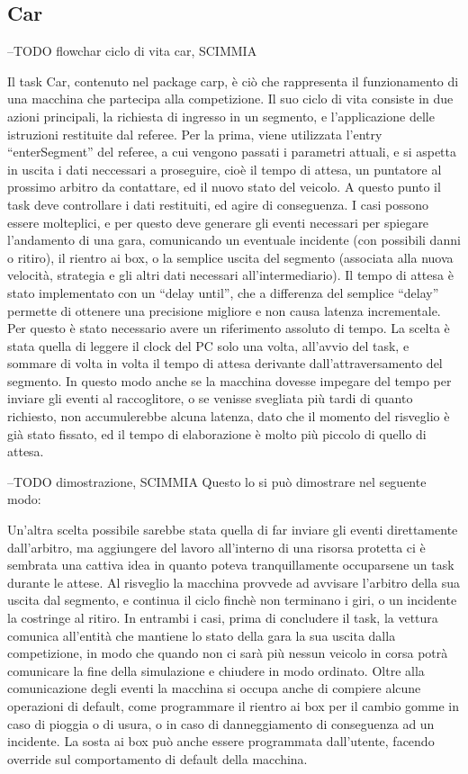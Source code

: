 \subsection{Car}

--TODO flowchar ciclo di vita car, SCIMMIA

Il task Car, contenuto nel package car\textunderscore p, è ciò che rappresenta il funzionamento di una macchina che partecipa alla competizione.
Il suo ciclo di vita consiste in due azioni principali, la richiesta di ingresso in un segmento, e l’applicazione delle istruzioni restituite dal referee.
Per la prima, viene utilizzata l’entry “enterSegment” del referee, a cui vengono passati i parametri attuali, e si aspetta in uscita i dati neccessari a proseguire, cioè il tempo di attesa, un puntatore al prossimo arbitro da contattare, ed il nuovo stato del veicolo.
A questo punto il task deve controllare i dati restituiti, ed agire di conseguenza. I casi possono essere molteplici, e per questo deve generare gli eventi necessari per spiegare l’andamento di una gara, comunicando un eventuale incidente (con possibili danni o ritiro), il rientro ai box, o la semplice uscita del segmento (associata alla nuova velocità, strategia e gli altri dati necessari all’intermediario).
Il tempo di attesa è stato implementato con un “delay until”, che a differenza del semplice “delay” permette di ottenere una precisione migliore e non causa latenza incrementale. Per questo è stato necessario avere un riferimento assoluto di tempo. La scelta è stata quella di leggere il clock del PC solo una volta, all’avvio del task, e sommare di volta in volta il tempo di attesa derivante dall’attraversamento del segmento.
In questo modo anche se la macchina dovesse impegare del tempo per inviare gli eventi al raccoglitore, o se venisse svegliata più tardi di quanto richiesto, non accumulerebbe alcuna latenza, dato che il momento del risveglio è già stato fissato, ed il tempo di elaborazione è molto più piccolo di quello di attesa.

--TODO dimostrazione, SCIMMIA
Questo lo si può dimostrare nel seguente modo:

Un’altra scelta possibile sarebbe stata quella di far inviare gli eventi direttamente dall’arbitro, ma aggiungere del lavoro all’interno di una risorsa protetta ci è sembrata una cattiva idea in quanto poteva tranquillamente occuparsene un task durante le attese.
Al risveglio la macchina provvede ad avvisare l’arbitro della sua uscita dal segmento, e continua il ciclo finchè non terminano i giri, o un incidente la costringe al ritiro. In entrambi i casi, prima di concludere il task, la vettura comunica all’entità che mantiene lo stato della gara la sua uscita dalla competizione, in modo che quando non ci sarà più nessun veicolo in corsa potrà comunicare la fine della simulazione e chiudere in modo ordinato.
Oltre alla comunicazione degli eventi la macchina si occupa anche di compiere alcune operazioni di default, come programmare il rientro ai box per il cambio gomme in caso di pioggia o di usura, o in caso di danneggiamento di conseguenza ad un incidente. La sosta ai box può anche essere programmata dall’utente, facendo override sul comportamento di default della macchina.

